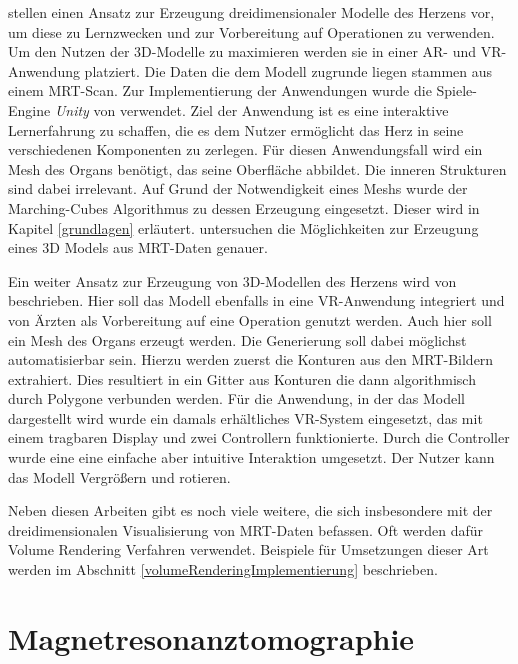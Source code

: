 \cite{Mangina17} stellen einen Ansatz zur Erzeugung dreidimensionaler Modelle des Herzens vor, um diese zu Lernzwecken und zur Vorbereitung auf Operationen zu verwenden. Um den Nutzen der 3D-Modelle zu maximieren werden sie in einer AR- und VR-Anwendung platziert. Die Daten die dem Modell zugrunde liegen stammen aus einem MRT-Scan. Zur Implementierung der Anwendungen wurde die Spiele-Engine \textit{Unity} von \cite{unity} verwendet.
Ziel der Anwendung ist es eine interaktive Lernerfahrung zu schaffen, die es dem Nutzer ermöglicht das Herz in seine verschiedenen Komponenten zu zerlegen. Für diesen Anwendungsfall wird ein Mesh des Organs benötigt, das seine Oberfläche abbildet. Die inneren Strukturen sind dabei irrelevant.
Auf Grund der Notwendigkeit eines Meshs wurde der Marching-Cubes Algorithmus zu dessen Erzeugung eingesetzt. Dieser wird in Kapitel \ref{grundlagen} erläutert.
\cite{Mangina17_2} untersuchen die Möglichkeiten zur Erzeugung eines 3D Models aus MRT-Daten genauer.

Ein weiter Ansatz zur Erzeugung von 3D-Modellen des Herzens wird von \cite{SORENSEN2001193} beschrieben. Hier soll das Modell ebenfalls in eine VR-Anwendung integriert und von Ärzten als Vorbereitung auf eine Operation genutzt werden. 
Auch hier soll ein Mesh des Organs erzeugt werden. Die Generierung soll dabei möglichst automatisierbar sein.  Hierzu werden zuerst die Konturen aus den MRT-Bildern extrahiert. Dies resultiert in ein Gitter aus Konturen die dann algorithmisch durch Polygone verbunden werden. 
Für die Anwendung, in der das Modell dargestellt wird wurde ein damals erhältliches VR-System eingesetzt, das mit einem tragbaren Display und zwei Controllern funktionierte. 
Durch die Controller wurde eine eine einfache aber intuitive Interaktion umgesetzt. Der Nutzer kann das Modell Vergrößern und rotieren.  

Neben diesen Arbeiten gibt es noch viele weitere, die sich insbesondere mit der dreidimensionalen Visualisierung von MRT-Daten befassen. Oft werden dafür Volume Rendering Verfahren verwendet. Beispiele für Umsetzungen dieser Art werden im Abschnitt \ref{volumeRenderingImplementierung} beschrieben.

\section{Magnetresonanztomographie}
\label{mrt}												 %

